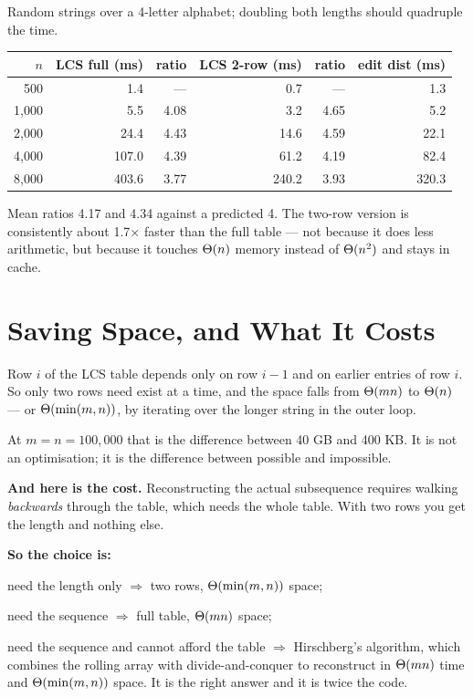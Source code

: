 \begin{worked}
Random strings over a 4-letter alphabet; doubling both lengths should quadruple
the time.

\begin{center}
\begin{tabular}{@{}rrrrrr@{}}
\toprule
\rowcolor{primary!15}
$n$ & LCS full (ms) & ratio & LCS 2-row (ms) & ratio & edit dist (ms) \\
\midrule
   500 &   1.4 & ---  &   0.7 & ---  &   1.3 \\
1{,}000 &   5.5 & 4.08 &   3.2 & 4.65 &   5.2 \\
2{,}000 &  24.4 & 4.43 &  14.6 & 4.59 &  22.1 \\
4{,}000 & 107.0 & 4.39 &  61.2 & 4.19 &  82.4 \\
8{,}000 & 403.6 & 3.77 & 240.2 & 3.93 & 320.3 \\
\bottomrule
\end{tabular}
\end{center}

\smallskip
Mean ratios 4.17 and 4.34 against a predicted 4. The two-row version is
consistently about 1.7$\times$ faster than the full table --- not because it
does less arithmetic, but because it touches $\Theta(n)$ memory instead of
$\Theta(n^{2})$ and stays in cache.
\end{worked}

\section{Saving Space, and What It Costs}

\begin{conceptbox}
Row $i$ of the LCS table depends only on row $i-1$ and on earlier entries of
row $i$. So only two rows need exist at a time, and the space falls from
$\Theta(mn)$ to $\Theta(n)$ --- or $\Theta(\min(m,n))$, by iterating over the
longer string in the outer loop.

\smallskip
At $m = n = 100{,}000$ that is the difference between 40 GB and 400 KB. It is
not an optimisation; it is the difference between possible and impossible.

\smallskip
\textbf{And here is the cost.} Reconstructing the actual subsequence requires
walking \emph{backwards} through the table, which needs the whole table. With
two rows you get the length and nothing else.

\smallskip
\textbf{So the choice is:}
\begin{tight}
  \item need the length only $\Rightarrow$ two rows, $\Theta(\min(m,n))$ space;
  \item need the sequence $\Rightarrow$ full table, $\Theta(mn)$ space;
  \item need the sequence and cannot afford the table $\Rightarrow$
        Hirschberg's algorithm, which combines the rolling array with
        divide-and-conquer to reconstruct in $\Theta(mn)$ time and
        $\Theta(\min(m,n))$ space. It is the right answer and it is twice the
        code.
\end{tight}
\end{conceptbox}

